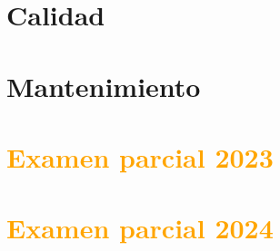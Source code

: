 \documentclass[a4paper,11pt]{article}
\begin{document}
    \clearpage


    \part{\textcolor{primaryblue}{Calidad}}\label{part:calidad}
    


    \clearpage


    \part{\textcolor{primaryblue}{Mantenimiento}}\label{part:mantenimiento}
    

    \clearpage

    \part{\textcolor{orange}{Examen parcial 2023}}\label{part:examen-parcial-2023}
    

    \clearpage

    \part{\textcolor{orange}{Examen parcial 2024}}\label{part:examen-parcial-2024}
    
\end{document}
